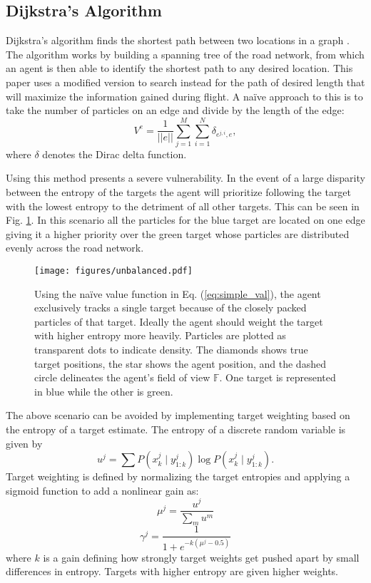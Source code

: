 \documentclass[letterpaper, 10 pt, conference]{ieeeconf}  %
\begin{document}
\subsection{Dijkstra's Algorithm}
Dijkstra's algorithm finds the shortest path between two locations in a graph \cite{skiena1998algorithm}. The algorithm works by building a spanning tree of the road network, from which an agent is then able to identify the shortest path to any desired location. This paper uses a modified version to search instead for the path of desired length that will maximize the information gained during flight. A na\"ive approach to this is to take the number of particles on an edge and divide by the length of the edge: 
\begin{equation}\label{eq:simple_val}
V^{e} = \frac{1}{||e||}\sum_{j=1}^M \sum_{i=1}^{N}\delta_{e^{j,i},e},
\end{equation}
where $\delta$ denotes the Dirac delta function.

Using this method presents a severe vulnerability. In the event of a large disparity between the entropy of the targets the agent will prioritize following the target with the lowest entropy to the detriment of all other targets. This can be seen in Fig. \ref{fig:unbalanced}. In this scenario all the particles for the blue target are located on one edge giving it a higher priority over the green target whose particles are distributed evenly across the road network.

\begin{figure}
\centering
\texttt{[image: figures/unbalanced.pdf]}
\caption{Using the na\"ive value function in Eq. (\ref{eq:simple_val}), the agent exclusively tracks a single target because of the closely packed particles of that target. Ideally the agent should weight the target with higher entropy more heavily. Particles are plotted as transparent dots to indicate density. The diamonds shows true target positions, the star shows the agent position, and the dashed circle delineates the agent's field of view $\mathbb{F}$. One target is represented in blue while the other is green.}
\label{fig:unbalanced}
\end{figure}

The above scenario can be avoided by implementing target weighting based on the entropy of a target estimate. The entropy \cite{Shannon1948} of a discrete random variable is given by
\begin{equation}%
    u^j = \sum{P(x^j_k \mid y^j_{1:k})\log P(x^j_k \mid y^j_{1:k})}.
\end{equation}
Target weighting is defined by normalizing the target entropies and applying a sigmoid function to add a nonlinear gain as:
\begin{equation}%
    \mu^j = \frac{u^j}{\sum_m u^m}
\end{equation}
\begin{equation}\label{eq:sigmoid}
    \gamma^j = \frac{1}{1 + e^{-k(\mu^j - 0.5)}}
\end{equation}
where $k$ is a gain defining how strongly target weights get pushed apart by small differences in entropy. Targets with higher entropy are given higher weights.
\end{document}
